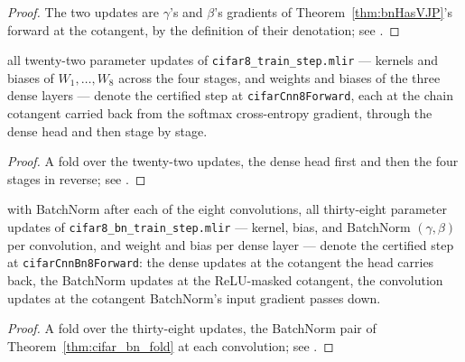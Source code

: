 \begin{proof}
\leanok
The two updates are \(\gamma\)'s and \(\beta\)'s gradients of
Theorem~\ref{thm:bnHasVJP}'s forward at the cotangent, by the definition
of their denotation; see
.
\end{proof}

\begin{theorem}
  \label{thm:cifar8_step_tie}
  \leanok
  \Prove{} all twenty-two parameter updates of
  \texttt{cifar8\_train\_step.mlir} --- kernels and biases of \(W_1, \dots, W_8\)
  across the four stages, and weights and biases of the three dense layers ---
  denote the certified step at \texttt{cifarCnn8Forward}, each at the chain
  cotangent carried back from the softmax cross-entropy gradient, through the
  dense head and then stage by stage.
\end{theorem}

\begin{proof}
\leanok
A fold over the twenty-two updates, the dense head first and then the four
stages in reverse; see
.
\end{proof}

\begin{theorem}
  \label{thm:cifar8bn_step_tie}
  \leanok
  \Prove{} with BatchNorm after each of the eight convolutions, all
  thirty-eight parameter updates of \texttt{cifar8\_bn\_train\_step.mlir} ---
  kernel, bias, and BatchNorm \((\gamma, \beta)\) per convolution, and weight
  and bias per dense layer --- denote the certified step at
  \texttt{cifarCnnBn8Forward}: the dense updates at the cotangent the head
  carries back, the BatchNorm updates at the ReLU-masked cotangent, the
  convolution updates at the cotangent BatchNorm's input gradient passes down.
\end{theorem}

\begin{proof}
\leanok
A fold over the thirty-eight updates, the BatchNorm pair of
Theorem~\ref{thm:cifar_bn_fold} at each convolution; see
.
\end{proof}


